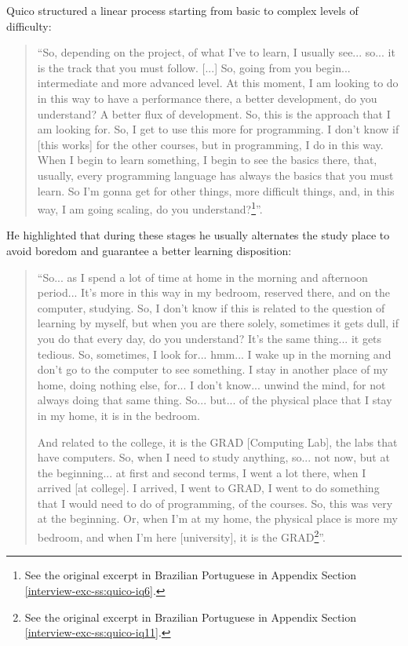Quico structured a linear process starting from basic to complex levels of difficulty:
\begin{quote}
    “So, depending on the project, of what I've to learn, I usually see... so... it is the track that you must follow. [...] So, going from you begin... intermediate and more advanced level. At this moment, I am looking to do in this way to have a performance there, a better development, do you understand? A better flux of development. So, this is the approach that I am looking for. So, I get to use this more for programming. I don't know if [this works] for the other courses, but in programming, I do in this way. When I begin to learn something, I begin to see the basics there, that, usually, every programming language has always the basics that you must learn. So I'm gonna get for other things, more difficult things, and, in this way, I am going scaling, do you understand?\footnote{See the original excerpt in Brazilian Portuguese in Appendix Section \ref{interview-exc-ss:quico-iq6}.}”.    
\end{quote}
He highlighted that during these stages he usually alternates the study place to avoid boredom and guarantee a better learning disposition:
\begin{quote}
    “So... as I spend a lot of time at home in the morning and afternoon period... It's more in this way in my bedroom, reserved there, and on the computer, studying. So, I don't know if this is related to the question of learning by myself, but when you are there solely, sometimes it gets dull, if you do that every day, do you understand? It's the same thing... it gets tedious. So, sometimes, I look for... hmm... I wake up in the morning and don't go to the computer to see something. I stay in another place of my home, doing nothing else, for... I don't know... unwind the mind, for not always doing that same thing. So... but... of the physical place that I stay in my home, it is in the bedroom.

    And related to the college, it is the GRAD [Computing Lab], the labs that have computers. So, when I need to study anything, so... not now, but at the beginning... at first and second terms, I went a lot there, when I arrived [at college]. I arrived, I went to GRAD, I went to do something that I would need to do of programming, of the courses. So, this was very at the beginning. Or, when I'm at my home, the physical place is more my bedroom, and when I'm here [university], it is the GRAD\footnote{See the original excerpt in Brazilian Portuguese in Appendix Section \ref{interview-exc-ss:quico-iq11}.}”.
\end{quote}


